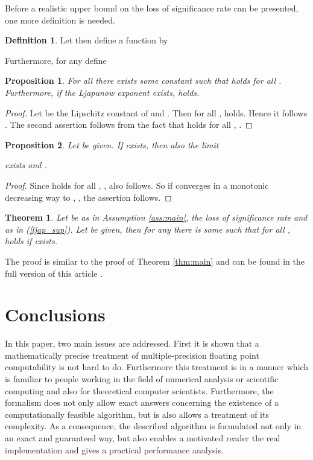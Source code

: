 \documentclass[copyright,creativecommons]{eptcs}
\newtheorem{proposition}{Proposition}[section]
\newtheorem{theorem}{Theorem}[section]
\theoremstyle{definition}
\newtheorem{definition}{Definition}[section]
\begin{document}
Before a realistic upper bound on the loss of significance rate
can be presented, one more definition is needed.
\begin{definition}
Let  then define a function  by

Furthermore, for any  define

\end{definition}
\begin{proposition}
For all  there exists some constant 
such that 
holds for all . Furthermore, if the Ljapunow
exponent  exists,
 holds.
\end{proposition}
\begin{proof}
Let  be the Lipschitz constant of  and .
Then for all ,
 holds. Hence it follows
.
The second assertion follows from the
fact that  holds for all ,
. 
\end{proof}
\begin{proposition}
Let  be given. If  exists, then
also the limit

exists and .
\end{proposition}
\begin{proof}
Since  holds
for all , , also
 follows. So if 
converges in a monotonic decreasing way to ,
, the assertion follows.

\end{proof}
\begin{theorem}
\label{thm:ubnd}
Let  be as in Assumption \ref{ass:main},  the loss
of significance rate and  as in
(\ref{ljap_sup}). Let  be given, then for any
 there is some  such that for all ,
 holds
if  exists.
\end{theorem}
The proof is similar to the proof of Theorem \ref{thm:main}
and can be found in the full version of this article \cite{sp10}.

\section{Conclusions}
In this paper, two main issues are addressed. First it is
shown that a mathematically precise treatment
of multiple-precision floating point computability is not hard
to do. Furthermore this
treatment is in a manner which is familiar to people working
in the field of numerical analysis or scientific computing and
also for theoretical computer scientists. Furthermore, the
formalism does not only allow exact answers concerning the
existence of a computationally feasible algorithm, but is also
allows a treatment of its complexity. As a consequence, the
described algorithm is formulated not only in an exact and
guaranteed way, but also enables a motivated reader the real
implementation and gives a practical performance analysis.
\end{document}
